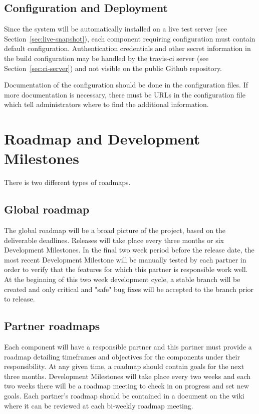\documentclass{learnpad}
\begin{document}
\subsection{Configuration and Deployment}
\label{sec:deployment-process}

Since the system will be automatically installed on a live test server
(see Section~\ref{sec:live-snapshot}), each component requiring configuration must
contain default configuration. Authentication credentials and other secret information
in the build configuration may be handled by the
travis-ci server (see Section~\ref{sec:ci-server}) and not visible on the public Github repository.

Documentation of the configuration should be done in the configuration files. If more
documentation is necessary, there must be URLs in the configuration file which tell
administrators where to find the additional information.

\section{Roadmap and Development Milestones}
\label{sec:roadmap}

There is two different types of roadmaps.

\subsection{Global roadmap}
\label{sec:global-roadmap}

The global roadmap will be a broad picture of the project, based on the deliverable
deadlines. Releases will take place every three months or six Development Milestones.
In the final two week period before the release date, the most recent Development
Milestone will be manually tested by each partner in order to verify that the
features for which this partner is responsible work well. At the beginning of this
two week development cycle, a stable branch will be created and only critical and
"safe" bug fixes will be accepted to the branch prior to release.

\subsection{Partner roadmaps}
\label{sec:partner-roadmaps}

Each component will have a responsible partner and this partner must provide a roadmap
detailing timeframes and objectives for the components under their responsibility. At any
given time, a roadmap should contain goals for the next three months.
Development Milestones will take place every two weeks and each two weeks there will be
a roadmap meeting to check in on progress and set new goals. Each partner's roadmap
should be contained in a document on the wiki where it can be reviewed at each bi-weekly
roadmap meeting.
\end{document}
